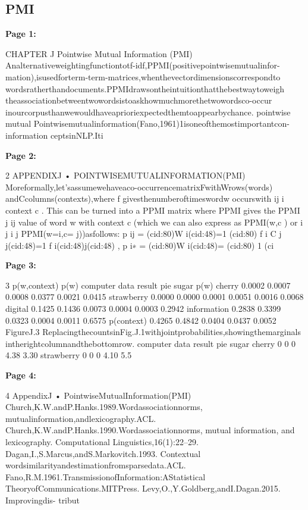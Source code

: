 \documentclass[11pt,a4paper]{article}
\begin{document}
\subsection{PMI}

\textbf{Page 1:}

CHAPTER
J Pointwise Mutual Information
(PMI)
Analternativeweightingfunctiontotf-idf,PPMI(positivepointwisemutualinfor-
mation),isusedforterm-term-matrices,whenthevectordimensionscorrespondto
wordsratherthandocuments.PPMIdrawsontheintuitionthatthebestwaytoweigh
theassociationbetweentwowordsistoaskhowmuchmorethetwowordsco-occur
inourcorpusthanwewouldhaveaprioriexpectedthemtoappearbychance.
pointwise
mutual
Pointwisemutualinformation(Fano,1961)1isoneofthemostimportantcon-
information
ceptsinNLP.Iti

\textbf{Page 2:}

2 APPENDIXJ • POINTWISEMUTUALINFORMATION(PMI)
Moreformally,let’sassumewehaveaco-occurrencematrixFwithWrows(words)
andCcolumns(contexts),where f givesthenumberoftimeswordw occurswith
ij i
context c . This can be turned into a PPMI matrix where PPMI gives the PPMI
j ij
value of word w with context c (which we can also express as PPMI(w,c ) or
i j i j
PPMI(w=i,c= j))asfollows:
p ij = (cid:80)W i(cid:48)=1 (cid:80) f i C j j(cid:48)=1 f i(cid:48)j(cid:48) , p i∗ = (cid:80)W i(cid:48)= (cid:80) 1 (ci

\textbf{Page 3:}

3
p(w,context) p(w)
computer data result pie sugar p(w)
cherry 0.0002 0.0007 0.0008 0.0377 0.0021 0.0415
strawberry 0.0000 0.0000 0.0001 0.0051 0.0016 0.0068
digital 0.1425 0.1436 0.0073 0.0004 0.0003 0.2942
information 0.2838 0.3399 0.0323 0.0004 0.0011 0.6575
p(context) 0.4265 0.4842 0.0404 0.0437 0.0052
FigureJ.3 ReplacingthecountsinFig.J.1withjointprobabilities,showingthemarginals
intherightcolumnandthebottomrow.
computer data result pie sugar
cherry 0 0 0 4.38 3.30
strawberry 0 0 0 4.10 5.5

\textbf{Page 4:}

4 AppendixJ • PointwiseMutualInformation(PMI)
Church,K.W.andP.Hanks.1989.Wordassociationnorms,
mutualinformation,andlexicography.ACL.
Church,K.W.andP.Hanks.1990.Wordassociationnorms,
mutual information, and lexicography. Computational
Linguistics,16(1):22–29.
Dagan,I.,S.Marcus,andS.Markovitch.1993. Contextual
wordsimilarityandestimationfromsparsedata.ACL.
Fano,R.M.1961.TransmissionofInformation:AStatistical
TheoryofCommunications.MITPress.
Levy,O.,Y.Goldberg,andI.Dagan.2015. Improvingdis-
tribut
\end{document}
